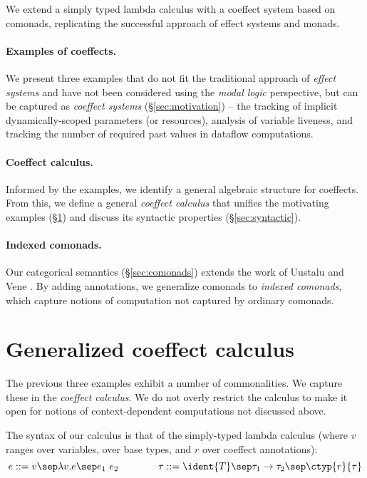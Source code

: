 We extend a simply typed lambda calculus with a coeffect system based on comonads,
replicating the successful approach of effect systems and monads.

\paragraph{Examples of coeffects.}
We present three examples that do not fit the traditional approach of
\emph{effect systems} and have not been considered using the \emph{modal logic}
perspective, but can be captured as \emph{coeffect systems} (\S\ref{sec:motivation}) --
the tracking of implicit dynamically-scoped parameters (or resources),
analysis of variable liveness, and tracking the
number of required past values in dataflow computations.

\paragraph{Coeffect calculus.}
Informed by the examples, we identify a general algebraic structure for coeffects. 
From this, we define a general \emph{coeffect calculus} that unifies the motivating 
examples (\S\ref{sec:calculus}) and discuss its syntactic properties (\S\ref{sec:syntactic}). 

\paragraph{Indexed comonads.}
Our categorical semantics (\S\ref{sec:comonads}) extends the work of Uustalu and Vene 
\cite{comonads-notions}. By adding annotations, we generalize comonads to \emph{indexed comonads}, 
which capture notions of computation not captured by ordinary comonads.


\section{Generalized coeffect calculus}
\label{sec:calculus}

The previous three examples exhibit a number of commonalities. We capture these in 
the \emph{coeffect calculus}. We do not overly restrict the calculus to make
it open for notions of context-dependent computations not discussed above.

The syntax of our calculus is that of the simply-typed lambda calculus
(where $v$ ranges over variables,  over base types, and $r$ over coeffect annotations):
%
\begin{equation*}
e ::= v \sep \lambda v.e \sep e_1~e_2
\quad\quad\quad\quad
\tau ::= \ident{T} \sep \tau_1 \rightarrow \tau_2 \sep \ctyp{r}{\tau}
\end{equation*}


